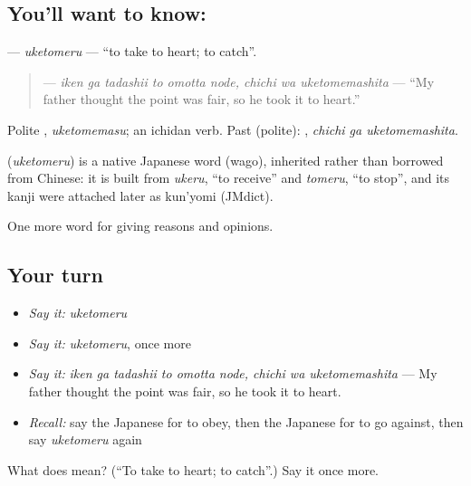 \subsection*{You'll want to know: }
\textbf{} — \emph{uketomeru} — \textquotedblleft{}to take to heart; to catch\textquotedblright{}.

\begin{quote}
\textbf{   } — \emph{iken ga tadashii to omotta node, chichi wa uketomemashita} — \textquotedblleft{}My father thought the point was fair, so he took it to heart.\textquotedblright{}
\end{quote}

Polite \textbf{}, \emph{uketomemasu}; an ichidan verb. Past (polite): \textbf{ }, \emph{chichi ga uketomemashita}.

\begin{cousinweb}
\textbf{} (\emph{uketomeru}) is a native Japanese word (wago), inherited rather than borrowed from Chinese: it is built from \emph{ukeru}, \textquotedblleft{}to receive\textquotedblright{} and \emph{tomeru}, \textquotedblleft{}to stop\textquotedblright{}, and its kanji were attached later as kun'yomi (JMdict).
\end{cousinweb}

\begin{grammarlens}[title={What you've built}]
One more word for giving reasons and opinions.
\end{grammarlens}

\subsection*{Your turn}
\begin{itemize}
\raggedright
  \item \emph{Say it:} \emph{uketomeru}
  \item \emph{Say it:} \emph{uketomeru}, once more
  \item \emph{Say it:} \emph{iken ga tadashii to omotta node, chichi wa uketomemashita} — My father thought the point was fair, so he took it to heart.
  \item \emph{Recall:} say the Japanese for to obey, then the Japanese for to go against, then say \emph{uketomeru} again
\end{itemize}

\begin{tcolorbox}[breakable,colback=teal!4,colframe=teal!35!black,title={Before you move on}]
What does  mean? (\textquotedblleft{}To take to heart; to catch\textquotedblright{}.) Say it once more.
\end{tcolorbox}
